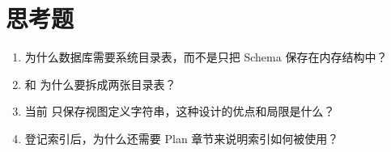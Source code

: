 \section{思考题}
\label{sec:metadata-questions}

\begin{enumerate}
  \item 为什么数据库需要系统目录表，而不是只把 Schema 保存在内存结构中？
  \item {} 和  为什么要拆成两张目录表？
  \item 当前  只保存视图定义字符串，这种设计的优点和局限是什么？
  \item {} 登记索引后，为什么还需要 Plan 章节来说明索引如何被使用？
\end{enumerate}
